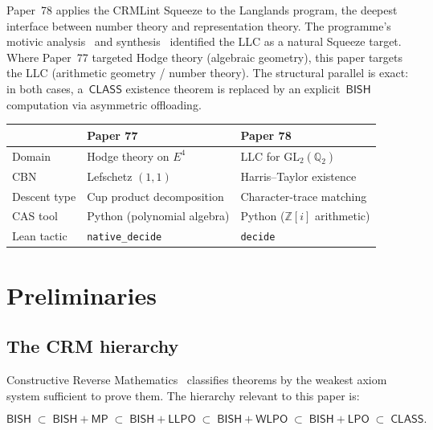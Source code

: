 \documentclass[11pt]{article}
\theoremstyle{plain}
\theoremstyle{definition}
\theoremstyle{remark}
\newcommand{\Z}{\mathbb{Z}}
\newcommand{\Q}{\mathbb{Q}}
\newcommand{\GL}{\mathrm{GL}}
\newcommand{\BISH}{\mathsf{BISH}}
\newcommand{\LPO}{\mathsf{LPO}}
\newcommand{\WLPO}{\mathsf{WLPO}}
\newcommand{\LLPO}{\mathsf{LLPO}}
\newcommand{\MP}{\mathsf{MP}}
\newcommand{\CLASS}{\mathsf{CLASS}}
\begin{document}
Paper~78 applies the CRMLint Squeeze to the Langlands program,
the deepest interface between number theory and representation
theory.  The programme's motivic analysis~\cite{Paper50} and
synthesis~\cite{Paper67} identified the LLC as a natural Squeeze
target.  Where Paper~77 targeted Hodge theory (algebraic
geometry), this paper targets the LLC (arithmetic geometry /
number theory).  The structural parallel is exact: in both cases,
a~$\CLASS$ existence theorem is replaced by an
explicit~$\BISH$ computation via asymmetric offloading.

\begin{center}
\begin{tabular}{lll}
\toprule
& \textbf{Paper 77} & \textbf{Paper 78} \\
\midrule
Domain & Hodge theory on $E^4$ & LLC for $\GL_2(\Q_2)$ \\
CBN & Lefschetz $(1,1)$ & Harris--Taylor existence \\
Descent type & Cup product decomposition & Character-trace matching \\
CAS tool & Python (polynomial algebra) & Python ($\Z[i]$ arithmetic) \\
Lean tactic & \texttt{native\_decide} & \texttt{decide} \\
\bottomrule
\end{tabular}
\end{center}

\section{Preliminaries}\label{sec:prelim}

\subsection{The CRM hierarchy}

Constructive Reverse Mathematics~\cite{Bishop1967,BridgeRichman1987}
classifies theorems by the weakest axiom system sufficient to
prove them.  The hierarchy relevant to this paper is:

\[
  \BISH \;\subset\; \BISH{+}\MP \;\subset\; \BISH{+}\LLPO
  \;\subset\; \BISH{+}\WLPO \;\subset\; \BISH{+}\LPO
  \;\subset\; \CLASS.
\]
\end{document}
